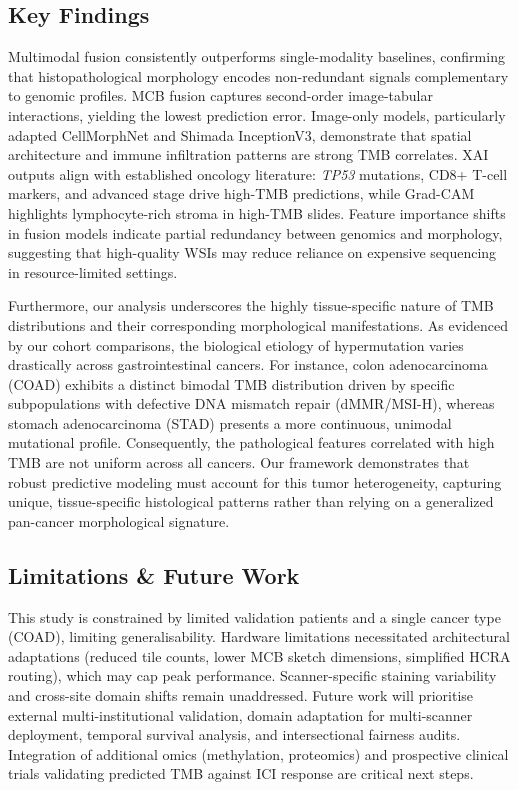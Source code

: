 \documentclass[11pt,a4paper]{article}
\begin{document}
\subsection{Key Findings}
Multimodal fusion consistently outperforms single-modality baselines, confirming that histopathological morphology encodes non-redundant signals complementary to genomic profiles. MCB fusion captures second-order image-tabular interactions, yielding the lowest prediction error. Image-only models, particularly adapted CellMorphNet and Shimada InceptionV3, demonstrate that spatial architecture and immune infiltration patterns are strong TMB correlates. XAI outputs align with established oncology literature: \textit{TP53} mutations, CD8+ T-cell markers, and advanced stage drive high-TMB predictions, while Grad-CAM highlights lymphocyte-rich stroma in high-TMB slides. Feature importance shifts in fusion models indicate partial redundancy between genomics and morphology, suggesting that high-quality WSIs may reduce reliance on expensive sequencing in resource-limited settings.

Furthermore, our analysis underscores the highly tissue-specific nature of TMB distributions and their corresponding morphological manifestations. As evidenced by our cohort comparisons, the biological etiology of hypermutation varies drastically across gastrointestinal cancers. For instance, colon adenocarcinoma (COAD) exhibits a distinct bimodal TMB distribution driven by specific subpopulations with defective DNA mismatch repair (dMMR/MSI-H), whereas stomach adenocarcinoma (STAD) presents a more continuous, unimodal mutational profile. Consequently, the pathological features correlated with high TMB are not uniform across all cancers. Our framework demonstrates that robust predictive modeling must account for this tumor heterogeneity, capturing unique, tissue-specific histological patterns rather than relying on a generalized pan-cancer morphological signature.

\subsection{Limitations \& Future Work}
This study is constrained by limited validation patients and a single cancer type (COAD), limiting generalisability. Hardware limitations necessitated architectural adaptations (reduced tile counts, lower MCB sketch dimensions, simplified HCRA routing), which may cap peak performance. Scanner-specific staining variability and cross-site domain shifts remain unaddressed. Future work will prioritise external multi-institutional validation, domain adaptation for multi-scanner deployment, temporal survival analysis, and intersectional fairness audits. Integration of additional omics (methylation, proteomics) and prospective clinical trials validating predicted TMB against ICI response are critical next steps.
\end{document}
